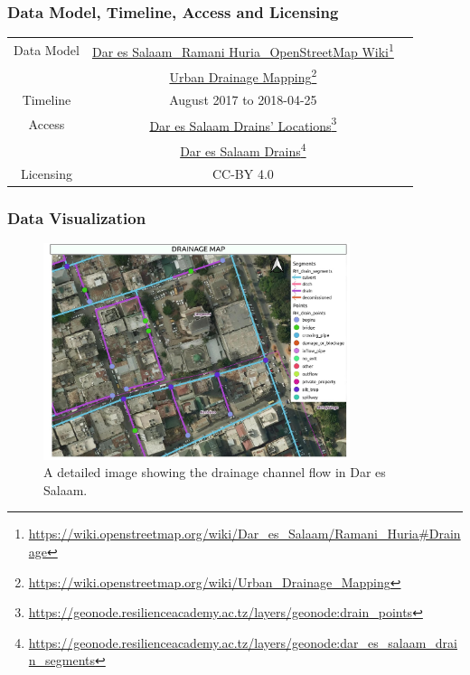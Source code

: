 \documentclass[a4paper,12pt,twoside]{article}
\begin{document}
\subsubsection{Data Model, Timeline, Access and Licensing}
\begin{center}
  \begin{tabular}{|c|c|c|}  
 \hline
    Data Model    &   \href{https://wiki.openstreetmap.org/wiki/Dar_es_Salaam/Ramani_Huria\#Drainage}{Dar es Salaam\_Ramani Huria\_OpenStreetMap Wiki}\footnote{\url{https://wiki.openstreetmap.org/wiki/Dar_es_Salaam/Ramani_Huria\#Drainage}}\\
    {} & \href{https://wiki.openstreetmap.org/wiki/Urban_Drainage_Mapping}{Urban Drainage Mapping}\footnote{\url{https://wiki.openstreetmap.org/wiki/Urban_Drainage_Mapping}}\\
\hline
   Timeline  & August 2017 to 2018-04-25 \\
\hline 
Access & {\href{https://geonode.resilienceacademy.ac.tz/layers/geonode:drain_points}{Dar es Salaam Drains' Locations}\footnote{\url{https://geonode.resilienceacademy.ac.tz/layers/geonode:drain_points}}}\\
{} & {\href{https://geonode.resilienceacademy.ac.tz/layers/geonode:dar_es_salaam_drain_segments}{Dar es Salaam Drains}\footnote{\url{https://geonode.resilienceacademy.ac.tz/layers/geonode:dar_es_salaam_drain_segments}}} \\ 
 \hline      
  Licensing & CC-BY 4.0 \\
 \hline
\end{tabular}
\end{center}

\subsubsection{Data Visualization}
\begin{figure}[h]
	\color{RHgreen}\caption{A detailed image showing the drainage channel flow in Dar es Salaam.}
		\centering
	\includegraphics[width=0.8\textwidth]{images/Drainage_Visualization.jpeg}
	\end{figure}
\end{document}
